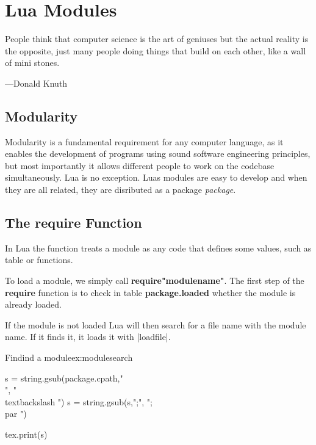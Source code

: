 \newfontfamily{}

           
\chapter{Lua Modules}

\epigraph{People think that computer science is the art of geniuses but the actual reality is the opposite, just many people doing things that build on each other, like a wall of mini stones.}{---Donald Knuth}


\section{Modularity}

Modularity is a fundamental requirement for any computer language, as it enables the development of programs using sound software engineering principles, but most importantly it allows different people to work on the codebase simultaneously. Lua is no exception. Luas modules are easy to develop and when they are all related, they are disributed as a package \textit{package}.

\section{The require Function}

In Lua the  function treats a module as any code that defines some values, such as table or functions. 

To load  a module, we simply call \textbf{require"modulename"}. The first step of the \textbf{require} function is to check in table \textbf{package.loaded} whether the module is already loaded.

If the module is not loaded Lua will then search for a file name with the module name. If it finds it, it loads it with |loadfile|. 


\begin{texexample}{Findind a module}{ex:modulesearch}
\begin{luacode*}
s = string.gsub(package.cpath,"\\", "\\textbackslash ")
s = string.gsub(s,";", ";\\par ")

tex.print(s)
\end{luacode*}
\end{texexample}

